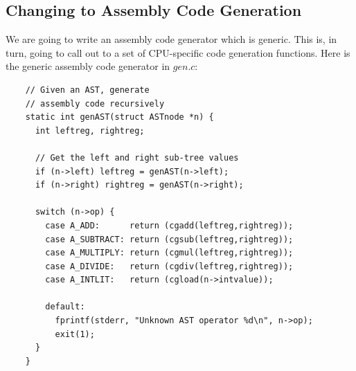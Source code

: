 \documentclass[journal, onecolumn, 12pt]{IEEEtran}
\begin{document}
\subsection{Changing to Assembly Code Generation}

We are going to write an assembly code generator which is generic. This is, in turn, going to call out to a set of CPU-specific code generation functions. Here is the generic assembly code generator in $gen.c$:

\begin{lstlisting}
    // Given an AST, generate
    // assembly code recursively
    static int genAST(struct ASTnode *n) {
      int leftreg, rightreg;
    
      // Get the left and right sub-tree values
      if (n->left) leftreg = genAST(n->left);
      if (n->right) rightreg = genAST(n->right);
    
      switch (n->op) {
        case A_ADD:      return (cgadd(leftreg,rightreg));
        case A_SUBTRACT: return (cgsub(leftreg,rightreg));
        case A_MULTIPLY: return (cgmul(leftreg,rightreg));
        case A_DIVIDE:   return (cgdiv(leftreg,rightreg));
        case A_INTLIT:   return (cgload(n->intvalue));
    
        default:
          fprintf(stderr, "Unknown AST operator %d\n", n->op);
          exit(1);
      }
    }
\end{lstlisting}
\end{document}
